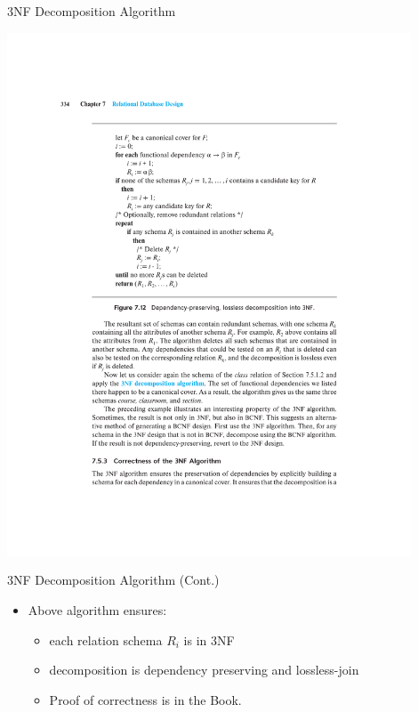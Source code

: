 \documentclass{beamer}
\begin{document}
\begin{frame}{3NF Decomposition Algorithm}
    \begin{center}
        \includegraphics[width=0.9\textwidth, trim={5.5cm 12.75cm 3cm 4.5cm}, clip]{figures/p334_Decomposition_3NF}
    \end{center}
\end{frame}

\begin{frame}{3NF Decomposition Algorithm (Cont.)}
    \begin{itemize}
        \item Above algorithm ensures:
        \begin{itemize}
            \item each relation schema $R_i$ is in 3NF
            \item decomposition is dependency preserving and lossless-join
            \item Proof of correctness is in the Book.
        \end{itemize}
    \end{itemize}
\end{frame}
\end{document}
